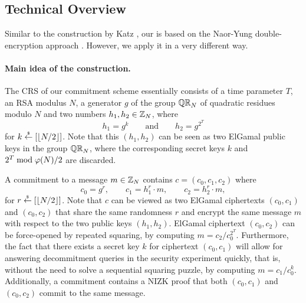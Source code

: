 \subsection{Technical Overview}\label{sec:techoverview}





Similar to the construction by Katz \etal \cite{TCC:KatLosXu20}, our is based on the Naor-Yung double-encryption approach \cite{STOC:NaoYun90}. However, we apply it in a very different way. 


\paragraph{Main idea of the construction.}
The CRS of our commitment scheme essentially consists of a time parameter $T$, an RSA modulus $N$, a generator $g$ of the group $\mathbb{QR}_N$ of quadratic residues modulo $N$ and two numbers $h_{1}, h_{2} \in \mathbb{Z}_{N}$, where
\[
h_{1} = g^{k} \qquad\text{and}\qquad h_{2} = g^{2^{T}} 
\]
for $k \stackrel{{\scriptscriptstyle\$}}{\leftarrow} [\left\lfloor N/2 \right\rfloor]$.
Note that this $(h_{1}, h_{2})$ can be seen as two ElGamal public keys in the group $\mathbb{QR}_N$, where the corresponding secret keys $k$ and $2^{T} \bmod \varphi(N)/2$ are discarded.

A commitment to a message $m \in \mathbb{Z}_{N}$ contains $c = (c_{0}, c_{1}, c_{2})$ where
\[
c_{0} = g^{r}, \qquad c_{1} = h_{1}^{r} \cdot m, \qquad c_{2} = h_{2}^{r} \cdot m,
\]
for $r \stackrel{{\scriptscriptstyle\$}}{\leftarrow} [\left\lfloor N/2 \right\rfloor]$.
Note that $c$ can be viewed as two ElGamal ciphertexts $(c_{0}, c_{1})$ and $(c_{0}, c_{2})$ that share the same randomness $r$ and encrypt the same message $m$ with respect to the two public keys $(h_{1}, h_{2})$.
ElGamal ciphertext $(c_{0}, c_{2})$ can be force-opened by repeated squaring, by computing $m = c_{2} / c_{0}^{2^{T}}$.
Furthermore, the fact that there exists a secret key $k$ for ciphertext $(c_{0}, c_{1})$ will allow for answering decommitment queries in the security experiment quickly, that is, without the need to solve a sequential squaring puzzle, by computing $m = c_{1} / c_{0}^{k}$.
Additionally, a commitment contains a NIZK proof that both  $(c_{0}, c_{1})$ and $(c_{0}, c_{2})$ commit to the same message. 

